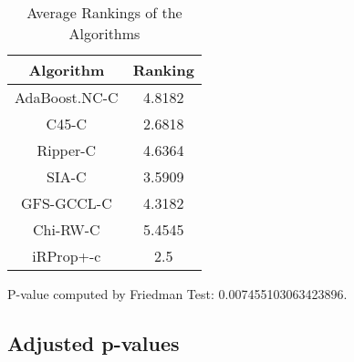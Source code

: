 \documentclass[a4paper,10pt]{article}
\begin{document}
\begin{table}[!htp]
\caption{Average Rankings of the Algorithms}
\centering
\begin{tabular}{|c|c|}\hline
Algorithm&Ranking\\\hline
AdaBoost.NC-C & 4.8182\\
C45-C & 2.6818\\
Ripper-C & 4.6364\\
SIA-C & 3.5909\\
GFS-GCCL-C & 4.3182\\
Chi-RW-C & 5.4545\\
iRProp+-c & 2.5\\
\hline
\end{tabular}
\end{table}
\flushleft
P-value computed by Friedman Test: 0.007455103063423896.\newline

\pagebreak

\subsection{Adjusted p-values}
\end{document}
